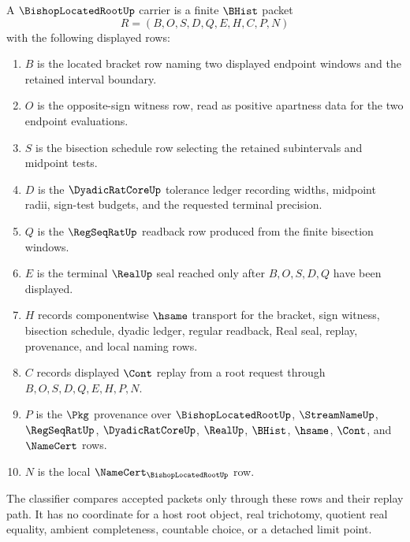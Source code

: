 \begin{definition}
\label{def:bishop-located-root-carrier}
A $\BishopLocatedRootUp$ carrier is a finite $\BHist$ packet
$$
R=(B,O,S,D,Q,E,H,C,P,N)
$$
with the following displayed rows:
\begin{enumerate}
\item $B$ is the located bracket row naming two displayed endpoint windows and the retained interval boundary.
\item $O$ is the opposite-sign witness row, read as positive apartness data for the two endpoint evaluations.
\item $S$ is the bisection schedule row selecting the retained subintervals and midpoint tests.
\item $D$ is the $\DyadicRatCoreUp$ tolerance ledger recording widths, midpoint radii, sign-test budgets, and the requested terminal precision.
\item $Q$ is the $\RegSeqRatUp$ readback row produced from the finite bisection windows.
\item $E$ is the terminal $\RealUp$ seal reached only after $B,O,S,D,Q$ have been displayed.
\item $H$ records componentwise $\hsame$ transport for the bracket, sign witness, bisection schedule, dyadic ledger, regular readback, Real seal, replay, provenance, and local naming rows.
\item $C$ records displayed $\Cont$ replay from a root request through $B,O,S,D,Q,E,H,P,N$.
\item $P$ is the $\Pkg$ provenance over $\BishopLocatedRootUp$, $\StreamNameUp$, $\RegSeqRatUp$, $\DyadicRatCoreUp$, $\RealUp$, $\BHist$, $\hsame$, $\Cont$, and $\NameCert$ rows.
\item $N$ is the local $\NameCert_{\BishopLocatedRootUp}$ row.
\end{enumerate}
The classifier compares accepted packets only through these rows and their replay path. It has no coordinate for a host root object, real trichotomy, quotient real equality, ambient completeness, countable choice, or a detached limit point.
\end{definition}

